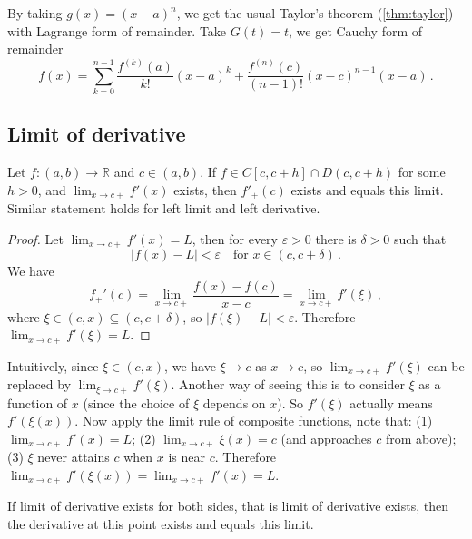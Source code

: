 \documentclass{article}
\newcommand{\R}{\mathbb R}
\begin{document}
By taking $ g(x) = (x - a)^n $, we get the usual Taylor's theorem (\ref{thm:taylor}) with Lagrange form of remainder. Take $ G(t) = t $, we get Cauchy form of remainder 
\[ 
    f(x) = \sum_{k = 0}^{n-1} \dfrac{f^{(k)} (a)}{k!} (x - a)^k + \dfrac{f^{(n)}(c)}{(n-1)!} (x - c)^{n - 1} (x - a) \,.
\]

\subsection{Limit of derivative}
\begin{theorem}
    Let $ f \colon (a, b) \to \R $ and $ c \in (a, b) $. If $ f \in C[c, c + h] \cap D(c, c + h) $ for some $ h > 0 $, and $ \lim_{x \to c+} f'(x) $ exists, then $ f'_+(c) $ exists and equals this limit. Similar statement holds for left limit and left derivative.
\end{theorem}

\begin{proof}
    Let $ \lim_{x \to c+} f'(x) = L $, then for every $ \varepsilon > 0 $ there is $ \delta > 0 $ such that
    \[ 
        |f(x) - L| < \varepsilon \quad \text{for } x \in (c, c + \delta) \,.
    \]
    We have
    \[ 
        f_+'(c) = \lim_{x \to c+} \dfrac{f(x) - f(c)}{x - c} = \lim_{x \to c+} f'(\xi) \,,
    \]
    where $ \xi \in (c, x) \subseteq (c, c + \delta) $, so $ |f(\xi) - L| < \varepsilon $. Therefore $ \lim_{x \to c+} f'(\xi) = L $.
\end{proof}

Intuitively, since $ \xi \in (c, x) $, we have $ \xi \to c $ as $ x \to c $, so $ \lim_{x \to c+} f'(\xi) $ can be replaced by $ \lim_{\xi \to c+} f'(\xi) $. Another way of seeing this is to consider $ \xi $ as a function of $ x $ (since the choice of $ \xi $ depends on $ x $). So $ f'(\xi) $ actually means $ f'(\xi(x)) $. Now apply the limit rule of composite functions, note that: (1) $ \lim_{x \to c+} f'(x) = L $; (2) $ \lim_{x \to c+} \xi(x) = c $ (and approaches $ c $ from above); (3) $ \xi $ never attains $ c $ when $ x $ is near $ c $. Therefore $ \lim_{x \to c+} f'(\xi(x)) = \lim_{x \to c+} f'(x) = L $.

If limit of derivative exists for both sides, that is limit of derivative exists, then the derivative at this point exists and equals this limit.
\end{document}
